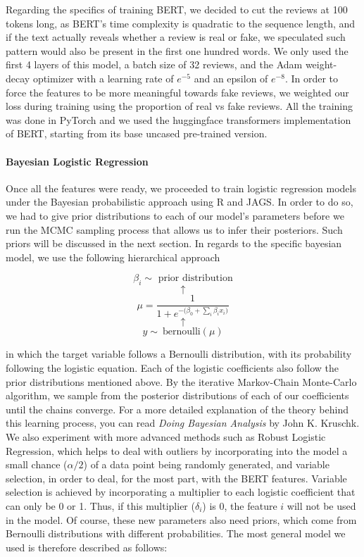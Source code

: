 \documentclass[man, floatsintext, 10pt]{apa6}
\begin{document}
Regarding the specifics of training BERT, we decided to cut the reviews at 100 tokens long, as BERT's time complexity is quadratic to the sequence length, and if the text actually reveals whether a review is real or fake, we speculated such pattern would also be present in the first one hundred words. We only used the first 4 layers of this model, a batch size of 32 reviews, and the Adam weight-decay optimizer with a learning rate of $e^{-5}$ and an epsilon of $e^{-8}$. In order to force the features to be more meaningful towards fake reviews, we weighted our loss during training using the proportion of real vs fake reviews. All the training was done in PyTorch and we used the huggingface transformers implementation of BERT, starting from its base uncased pre-trained version.

\vspace{2mm}

\paragraph{Bayesian Logistic Regression} Once all the features were ready, we proceeded to train logistic regression models under the Bayesian probabilistic approach using R and JAGS. In order to do so, we had to give prior distributions to each of our model's parameters before we run the MCMC sampling process that allows us to infer their posteriors. Such priors will be discussed in the next section. In regards to the specific bayesian model, we use the following hierarchical approach 

\[\beta_i \sim \text{ prior distribution} \] \[ \uparrow \] \[ \mu = \frac{1}{1 + e^{-\big(\beta_0 + \sum_i \beta_i x_i \big)}} \] \vspace{0.01mm}  \[ \uparrow \] 
\begin{equation} 
\label{Bern} 
y \sim\ \text{bernoulli} (\mu)
\end{equation}

in which the target variable follows a Bernoulli distribution, with its probability following the logistic equation. Each of the logistic coefficients also follow the prior distributions mentioned above. By the iterative Markov-Chain Monte-Carlo algorithm, we sample from the posterior distributions of each of our coefficients until the chains converge. For a more detailed explanation of the theory behind this learning process, you can read \textit{Doing Bayesian Analysis} by John K. Kruschk. We also experiment with more advanced methods such as Robust Logistic Regression, which helps to deal with outliers by incorporating into the model a small chance ($\alpha/2$) of a data point being randomly generated, and variable selection, in order to deal, for the most part, with the BERT features. Variable selection is achieved by incorporating a multiplier to each logistic coefficient that can only be 0 or 1. Thus, if this multiplier ($\delta_i$) is 0, the feature $i$ will not be used in the model. Of course, these new parameters also need priors, which come from Bernoulli distributions with different probabilities. The most general model we used is therefore described as follows:
\end{document}
